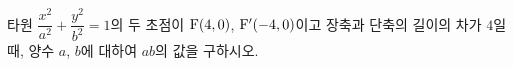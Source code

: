 타원 $\dfrac{x^2}{a^2}+\dfrac{y^2}{b^2}=1$의 두 초점이 $\mathrm{F}(4{,}\mkern3mu\mathopen{}0)$, $\mathrm{F}'(-4{,}\mkern3mu\mathopen{}0)$이고 장축과 단축의 길이의 차가 $4$일 때, 양수 $a$, $b$에 대하여 $ab$의 값을 구하시오.
